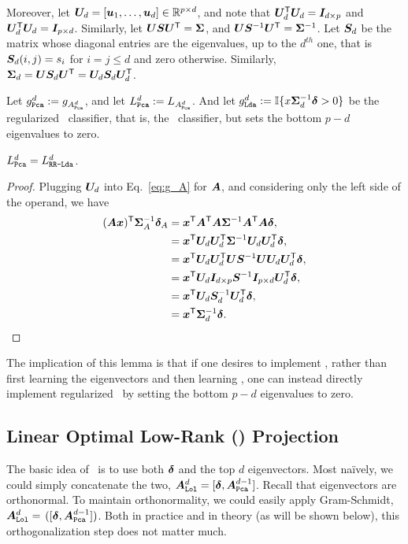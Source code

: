 \documentclass[10pt]{article}
\begin{document}
Moreover, let $\bU_d=[\bu_1,\ldots,\bu_d] \in \Real^{p \times d}$, and note that $\bU_d\T \bU_d = \bI_{d \times p}$ and $\bU_d\T \bU_d  = \bI_{p \times d}$.  Similarly, let $\bU \bS \bU\T = \bSig$, and $\bU \bS^{-1} \bU\T = \bSig^{-1}$.  Let $\bS_d$ be the matrix whose diagonal entries are the eigenvalues, up to the $d^{th}$ one, that is $\bS_d(i,j)=s_i$ for $i=j \leq d$ and zero otherwise.  Similarly, $\bSig_d=\bU \bS_d \bU\T=\bU_d \bS_d \bU_d\T$.

Let $g_{\Pca}^d:=g_{A_{\Pca}^d}$, and let $L_{\Pca}^d:=L_{A_{\Pca}^d}$.
And let $g_{\Lda}^d := \II \{ x \bSig_d^{-1} \bdel > 0\}$ be the regularized \Lda~classifier, that is, the \Lda~classifier, but sets the bottom $p-d$ eigenvalues to zero.

\begin{lem}
$L_{\Pca}^d = L_{\Rrlda}^d$.
\end{lem}

\begin{proof}
Plugging $\bU_d$ into Eq.~\eqref{eq:g_A} for $\bA$, and considering only the left side of the operand, we have
\begin{align*}
(\bA \bx)\T \bSig^{-1}_A \bdel_A &= \bx\T \bA\T \bA \bSig^{-1} \bA\T \bA \bdel,
\\&= \bx\T  \bU_d\bU_d\T \bSig^{-1} \bU_d\bU_d\T \bdel,
\\&= \bx\T  \bU_d \bU_d\T \bU \bS^{-1} \bU \bU_d\bU_d\T \bdel,
\\&= \bx\T  \bU_d \bI_{d \times p} \bS^{-1} \bI_{p \times d} \bU_d\T \bdel,
\\&= \bx\T  \bU_d \bS^{-1}_d  \bU_d\T \bdel ,
\\&= \bx\T  \bSig^{-1}_d  \bdel.
\end{align*}
\end{proof}

The implication of this lemma is that if one desires to implement \Rrlda, rather than first learning the eigenvectors and then learning \Lda, one can instead directly implement regularized \Lda~by setting the bottom $p-d$ eigenvalues to zero.




\subsection[LOL]{Linear Optimal Low-Rank (\Lol) Projection}


The basic idea of \Lol~is to use both $\bdel$ and the top $d$ eigenvectors.  Most na\"ively, we could simply concatenate the two, $\bA_{\Lol}^d=[\bdel,\bA_{\Pca}^{d-1}]$.
Recall that eigenvectors are orthonormal.  To maintain orthonormality, we could easily apply Gram-Schmidt,  $\bA_{\Lol}^d=$ $([\bdel, \bA_{\Pca}^{d-1}])$.
Both in practice and in theory (as will be shown below), this orthogonalization step does not matter much.
\end{document}
